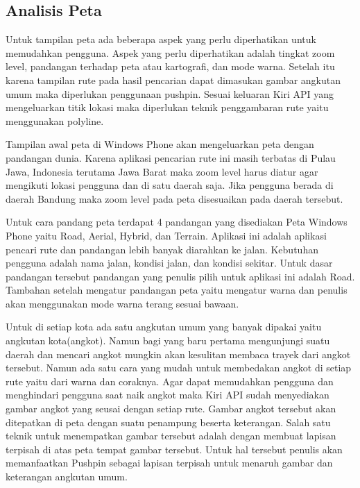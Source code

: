 \subsection{Analisis Peta}
\label{lab:Analisis Peta}
\hspace{0.5cm} Untuk tampilan peta ada beberapa aspek yang perlu diperhatikan untuk memudahkan pengguna. Aspek yang perlu diperhatikan adalah tingkat zoom level, pandangan terhadap peta atau kartografi, dan mode warna. Setelah itu karena tampilan rute pada hasil pencarian dapat dimasukan gambar angkutan umum maka diperlukan penggunaan pushpin. Sesuai keluaran Kiri API yang mengeluarkan titik lokasi maka diperlukan teknik penggambaran rute yaitu menggunakan polyline.

\hspace{0.5cm} Tampilan awal peta di Windows Phone akan mengeluarkan peta dengan pandangan dunia. Karena aplikasi pencarian rute ini masih terbatas di Pulau Jawa, Indonesia terutama Jawa Barat maka zoom level harus diatur agar mengikuti lokasi pengguna dan di satu daerah saja. Jika pengguna berada di daerah Bandung maka zoom level pada peta disesuaikan pada daerah tersebut.

\hspace{0.5cm} Untuk cara pandang peta terdapat 4 pandangan yang disediakan Peta Windows Phone yaitu Road, Aerial, Hybrid, dan Terrain. Aplikasi ini adalah aplikasi pencari rute dan pandangan lebih banyak diarahkan ke jalan. Kebutuhan pengguna adalah nama jalan, kondisi jalan, dan kondisi sekitar. Untuk dasar pandangan tersebut pandangan yang penulis pilih untuk aplikasi ini adalah Road. Tambahan setelah mengatur pandangan peta yaitu mengatur warna dan penulis akan menggunakan mode warna terang sesuai bawaan.


\hspace{0.5cm} Untuk di setiap kota ada satu angkutan umum yang banyak dipakai yaitu angkutan kota(angkot). Namun bagi yang baru pertama mengunjungi suatu daerah dan mencari angkot mungkin akan kesulitan membaca trayek dari angkot tersebut. Namun ada satu cara yang mudah untuk membedakan angkot di setiap rute yaitu dari warna dan coraknya. Agar dapat memudahkan pengguna dan menghindari pengguna saat naik angkot maka Kiri API sudah menyediakan gambar angkot yang seusai dengan setiap rute. Gambar angkot tersebut akan ditepatkan di peta dengan suatu penampung beserta keterangan. Salah satu teknik untuk menempatkan gambar tersebut adalah dengan membuat lapisan terpisah di atas peta tempat gambar tersebut. Untuk hal tersebut penulis akan memanfaatkan Pushpin sebagai lapisan terpisah untuk menaruh gambar dan keterangan angkutan umum.

